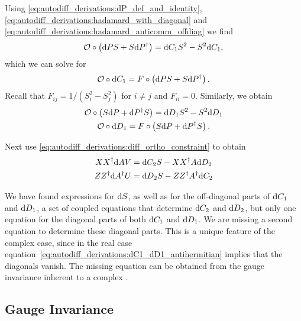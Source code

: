 Using \eqref{eq:autodiff_derivations:dP_def_and_identity}, \eqref{eq:autodiff_derivations:hadamard_with_diagonal} and \eqref{eq:autodiff_derivations:hadamard_anticomm_offdiag} we find
\begin{equation}
    \Off\hadamard\rBr{\dP S + S\dP^{\dagger}} = \dC_1 S^2 - S^2 \dC_1
    ,
\end{equation}
which we can solve for
\begin{equation}
    \Off\hadamard\dC_1 = F\hadamard\rBr{\dP S + S\dP^{\dagger}}
    .
    \label{eq:autodiff_derivations:dC1_offdiag_result}
\end{equation}
Recall that $F_{ij} = 1 / (S_i^2 - S_j^2)$ for $i\neq j$ and $F_{ii} = 0$.
Similarly, we obtain
\begin{gather}
    \Off\hadamard\rBr{S\dP + \dP^{\dagger} S} = \dD_1 S^2 - S^2 \dD_1
    \\
    \Off\hadamard\dD_1 = F\hadamard\rBr{S\dP + \dP^{\dagger} S}
    .
    \label{eq:autodiff_derivations:dD1_offdiag_result}
\end{gather}

Next use \eqref{eq:autodiff_derivations:diff_ortho_constraint} to obtain
\begin{gather}
    XX^{\dagger}\mathrm{d}{A} V = \mathrm{d}{C}_2 S - XX^{\dagger} A \mathrm{d}{D}_2
    \label{eq:autodiff_derivations:dC2_dD2_sylvester_1}
    \\
    ZZ^{\dagger}\mathrm{d}{A}^{\dagger} U = \mathrm{d}{D}_2 S - ZZ^{\dagger} A^{\dagger} \mathrm{d}{C}_2
    \label{eq:autodiff_derivations:dC2_dD2_sylvester_2}
\end{gather}

We have found expressions for $\mathrm{d}{S}$, as well as for the off-diagonal parts of $\mathrm{d}{C}_1$ and $\mathrm{d}{D}_1$, a set of coupled equations that determine $\mathrm{d}{C}_2$ and $\mathrm{d}{D}_2$, but only one equation for the diagonal parts of both $\mathrm{d}{C}_1$ and $\mathrm{d}{D}_1$.
We are missing a second equation to determine these diagonal parts.
This is a unique feature of the complex case, since in the real case equation\ \eqref{eq:autodiff_derivations:dC1_dD1_antihermitian} implies that the diagonals vanish.
The missing equation can be obtained from the gauge invariance inherent to a complex .

\subsection{Gauge Invariance}
\label{subsec:autodiff_derivation:svd:gauge_invariance}

